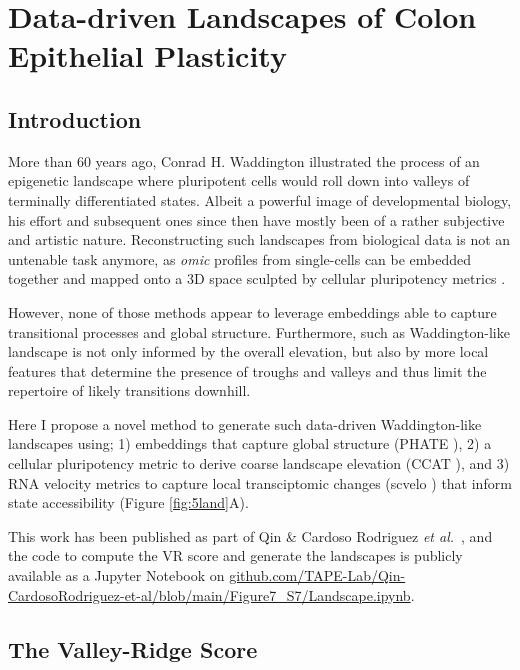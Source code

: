 \chapter{Data-driven Landscapes of Colon Epithelial Plasticity}
\label{05vr}

\section{Introduction}

More than 60 years ago, Conrad H. Waddington illustrated the process of an epigenetic landscape where pluripotent cells would roll down into valleys of terminally differentiated states\cite{ch_waddington_waddington_1957}. Albeit a powerful image of developmental biology, his effort and subsequent ones since then have mostly been of a rather subjective and artistic nature. Reconstructing such landscapes from biological data is not an untenable task anymore, as \emph{omic} profiles from single-cells can be embedded together and mapped onto a 3D space sculpted by cellular pluripotency metrics \cite{chen_single-cell_2019}.

However, none of those methods appear to leverage embeddings able to capture transitional processes and global structure. Furthermore, such as Waddington-like landscape is not only informed by the overall elevation, but also by more local features that determine the presence of troughs and valleys and thus limit the repertoire of likely transitions downhill.

Here I propose a novel method to generate such data-driven Waddington-like landscapes using; 1) embeddings that capture global structure (PHATE \cite{moon_visualizing_2019}), 2) a cellular pluripotency metric to derive coarse landscape elevation (CCAT \cite{teschendorff_single-cell_2017}), and 3) RNA velocity metrics to capture local transciptomic changes (scvelo \cite{bergen_generalizing_2020}) that inform state accessibility (Figure \ref{fig:5land}A).

This work has been published as part of Qin \& Cardoso Rodriguez \emph{et al.}~\cite{cardoso_rodriguez_single-cell_2023}, and the code to compute the VR score and generate the landscapes is publicly available as a Jupyter Notebook on \url{github.com/TAPE-Lab/Qin-CardosoRodriguez-et-al/blob/main/Figure7_S7/Landscape.ipynb}. 

\section{The Valley-Ridge Score}

